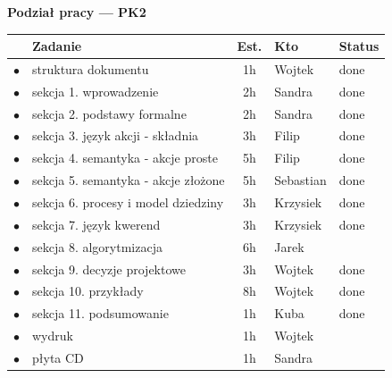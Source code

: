 \documentclass[11pt,a4paper]{article}
\newif\ifshowdrafts
\theoremstyle{definition}
\begin{document}
\sloppy

\ifshowdrafts
\thispagestyle{empty}
\color{todoorange}

\begin{center}
    {\LARGE\bfseries Podział pracy --- PK2}
\end{center}

\vspace{0.5cm}

\renewcommand{\arraystretch}{1.4}
\small
\begin{center}
\begin{tabular}{@{} c p{5.6cm} c p{2cm} p{1.8cm} @{}}
\toprule
 & \textbf{Zadanie} & \textbf{Est.} & \textbf{Kto} & \textbf{Status} \\
\midrule
$\bullet$ & struktura dokumentu                    & 1h & Wojtek & done \\
$\bullet$ & sekcja 1. wprowadzenie                & 2h & Sandra & done \\
$\bullet$ & sekcja 2. podstawy formalne           & 2h & Sandra & done\\
$\bullet$ & sekcja 3. język akcji - składnia    & 3h & Filip & done \\ 
$\bullet$ & sekcja 4. semantyka - akcje proste  & 5h & Filip & done \\ 
$\bullet$ & sekcja 5. semantyka - akcje złożone & 5h & Sebastian & done \\
$\bullet$ & sekcja 6. procesy i model dziedziny   & 3h & Krzysiek & done \\
$\bullet$ & sekcja 7. język kwerend               & 3h & Krzysiek & done \\
$\bullet$ & sekcja 8. algorytmizacja             & 6h & Jarek & \\
$\bullet$ & sekcja 9. decyzje projektowe          & 3h & Wojtek &  done \\
$\bullet$ & sekcja 10. przykłady                  & 8h & Wojtek &  done\\
$\bullet$ & sekcja 11. podsumowanie               & 1h & Kuba & done\\
$\bullet$ & wydruk                                        & 1h & Wojtek & \\
$\bullet$ & płyta CD                                      & 1h & Sandra & \\
\bottomrule
\end{tabular}
\end{center}
\normalsize
\end{document}
